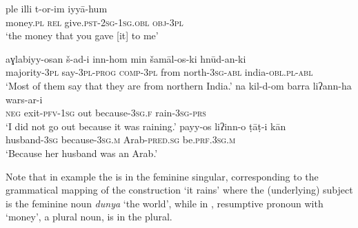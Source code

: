 \documentclass[output=paper]{langsci/langscibook}
\begin{document}
\ea \gll   ple illi t-or-im iyyā-hum\\
       money.\textsc{pl} \textsc{rel} give.\textsc{pst-2sg-1sg.obl} \textsc{obj-3pl}\\
\glt   ‘the money that you gave [it] to me’ \label{ple}
\z

\ea\label{most}
\gll aɣlabiyy-osan š-ad-i inn-hom min šamāl-os-ki hnūd-an-ki\\
     majority-\textsc{3pl} say-\textsc{3pl-prog} \textsc{comp-3pl} from        north-\textsc{3sg-abl} india-\textsc{obl.pl-abl}\\
\glt   ‘Most of them say that they are from northern India.’
\ex \gll na kil-d-om barra liʔann-ha wars-ar-i\\
       \textsc{neg} exit-\textsc{pfv-1sg} out because-\textsc{3sg.f} rain-\textsc{3sg-prs}\\
\glt   ‘I did not go out because it was raining.’\label{barra}
\ex \gll     payy-os liʔinn-o ṭāṭ-i kān\\
       husband-\textsc{3sg} because-\textsc{3sg.m} Arab-\textsc{pred.sg} be.\textsc{prf.3sg.m}\\
\glt   ‘Because her husband was an Arab.’
\z

Note that in example  the  is in the feminine singular, corresponding to the grammatical mapping of the   construction ‘it rains’ where the (underlying) subject is the feminine noun \textit{dunya} ‘the world’, while in , resumptive pronoun  with ‘money’, a plural noun, is in the plural.
\end{document}
